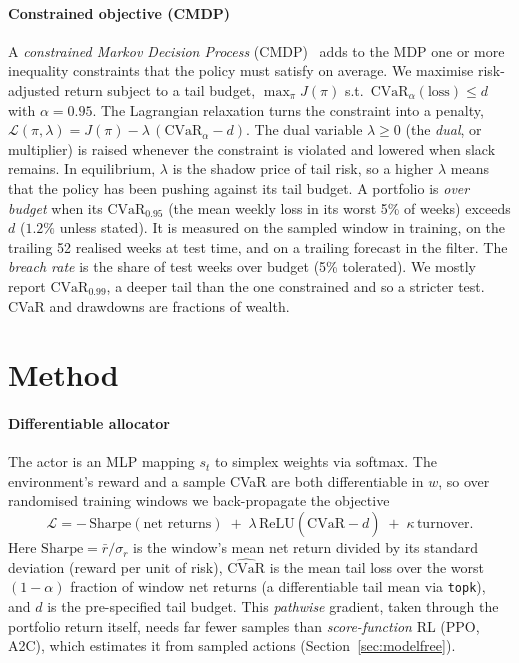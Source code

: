 \documentclass[sigconf]{acmart}
\begin{document}
\paragraph{Constrained objective (CMDP)} A \emph{constrained Markov Decision
Process} (CMDP)~\cite{altman1999cmdp} adds to the MDP one or more inequality constraints that
the policy must satisfy on average. We maximise risk-adjusted return subject to a tail budget,
$\max_\pi J(\pi)$ s.t.\ $\mathrm{CVaR}_\alpha(\text{loss})\le d$ with $\alpha=0.95$. The
Lagrangian relaxation turns the constraint into a penalty, $\mathcal{L}(\pi,\lambda)=J(\pi) -
\lambda\,(\mathrm{CVaR}_\alpha - d)$. The dual variable $\lambda\ge0$ (the \emph{dual}, or
multiplier) is raised whenever the constraint is violated and lowered when slack remains. In
equilibrium, $\lambda$ is the shadow price of tail risk, so a higher $\lambda$ means that the
policy has been pushing against its tail budget. A portfolio is \emph{over budget} when its
$\mathrm{CVaR}_{0.95}$ (the mean weekly loss in its worst 5\% of weeks) exceeds $d$ ($1.2\%$ unless stated). It is measured on the sampled window in training, on the trailing 52 realised weeks at test time, and
on a trailing forecast in the filter. The \emph{breach rate} is the share of test weeks over
budget (5\% tolerated). We mostly report $\mathrm{CVaR}_{0.99}$, a deeper tail than the one
constrained and so a stricter test. CVaR and drawdowns are fractions of wealth.

\section{Method}
\label{sec:method}

\paragraph{Differentiable allocator} The actor is an MLP mapping $s_t$ to simplex
weights via softmax. The environment's reward and a sample CVaR are both differentiable in $w$,
so over randomised training windows we back-propagate the objective
\begin{equation}\label{eq:loss}
\mathcal{L} = -\,\mathrm{Sharpe}(\text{net returns})
  \;+\; \lambda\,\mathrm{ReLU}(\widehat{\mathrm{CVaR}} - d)
  \;+\; \kappa\,\text{turnover}.
\end{equation}
Here $\mathrm{Sharpe}=\bar{r}/\sigma_r$ is the window's mean net return divided by its
standard deviation (reward per unit of risk), $\widehat{\mathrm{CVaR}}$ is the mean
tail loss over the worst $(1{-}\alpha)$ fraction of window net returns (a differentiable
tail mean via \texttt{topk}), and $d$ is the pre-specified tail budget. This \emph{pathwise} gradient,
taken through the portfolio return itself, needs far fewer samples than \emph{score-function} RL
(PPO, A2C), which estimates it from sampled actions (Section~\ref{sec:modelfree}).
\end{document}
